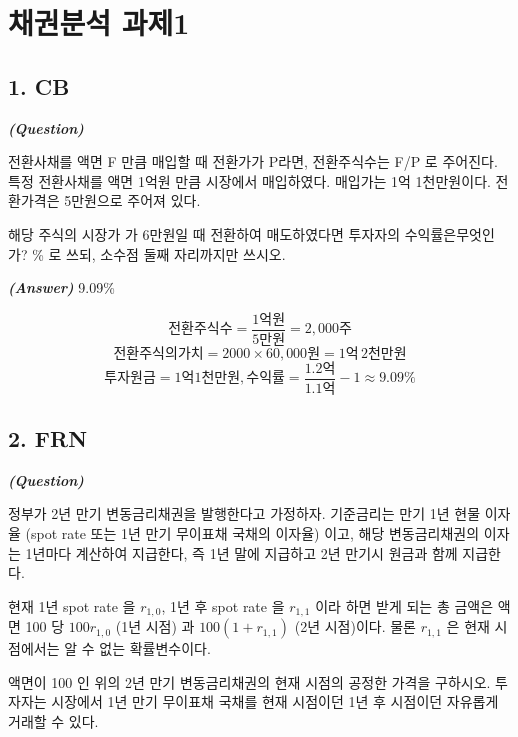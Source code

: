 \documentclass[
  a4paper,
  DIV=11,
  numbers=noendperiod]{scrreprt}
\begin{document}
\chapter*{채권분석 과제1}\label{uxcc44uxad8cuxbd84uxc11d-uxacfcuxc81c1}


\section*{1. CB}\label{cb}


\textbf{\emph{(Question)}}

전환사채를 액면 F 만큼 매입할 때 전환가가 P라면, 전환주식수는 F/P 로
주어진다. 특정 전환사채를 액면 1억원 만큼 시장에서 매입하였다. 매입가는
1억 1천만원이다. 전환가격은 5만원으로 주어져 있다.

해당 주식의 시장가 가 6만원일 때 전환하여 매도하였다면 투자자의
수익률은무엇인가? \% 로 쓰되, 소수점 둘째 자리까지만 쓰시오.

\textbf{\emph{(Answer)}} 9.09\%

\[전환주식수 = \frac{1억원}{5만원} = 2,000주\]
\[전환주식의 가치 = 2000\times 60,000원=1억\,2천만원\]
\[투자원금=1억1천만원, 수익률=\frac{1.2억}{1.1억}-1\approx 9.09\%\]

\section*{2. FRN}\label{frn}


\textbf{\emph{(Question)}}

정부가 2년 만기 변동금리채권을 발행한다고 가정하자. 기준금리는 만기 1년
현물 이자율 (spot rate 또는 1년 만기 무이표채 국채의 이자율) 이고, 해당
변동금리채권의 이자는 1년마다 계산하여 지급한다, 즉 1년 말에 지급하고
2년 만기시 원금과 함께 지급한다.

현재 1년 spot rate 을 \(r_{1,0}\), 1년 후 spot rate 을 \(r_{1,1}\) 이라
하면 받게 되는 총 금액은 액면 100 당 \(100r_{1,0}\) (1년 시점) 과
\(100(1 + r_{1,1})\) (2년 시점)이다. 물론 \(r_{1,1}\) 은 현재 시점에서는
알 수 없는 확률변수이다.

액면이 100 인 위의 2년 만기 변동금리채권의 현재 시점의 공정한 가격을
구하시오. 투자자는 시장에서 1년 만기 무이표채 국채를 현재 시점이던 1년
후 시점이던 자유롭게 거래할 수 있다.
\end{document}
